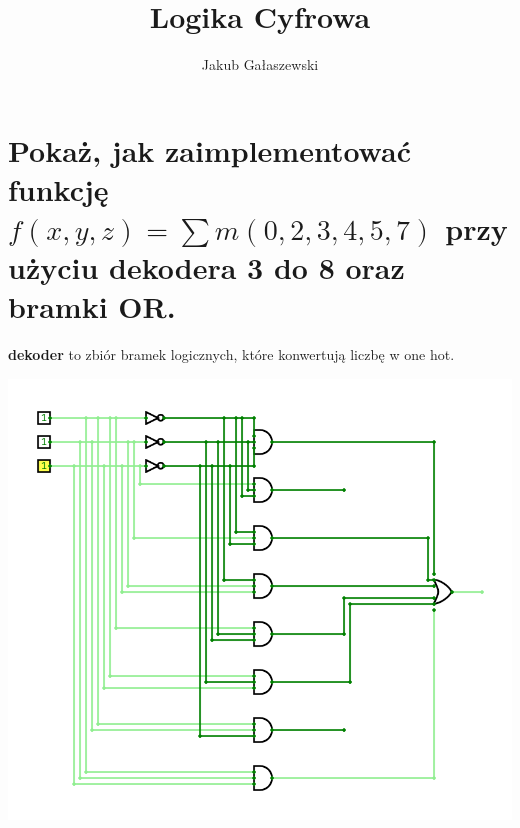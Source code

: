 \documentclass{article}
\title{Logika Cyfrowa}
\author{Jakub Gałaszewski}
\begin{document}
\maketitle
\section{Pokaż, jak zaimplementować funkcję $f (x, y, z) = \sum m(0, 2, 3, 4, 5, 7)$ przy użyciu dekodera 3 do 8 oraz bramki OR.}
\textbf{dekoder} to zbiór bramek logicznych, które konwertują liczbę w one hot.  
\begin{center}
	\includegraphics[scale=0.3]{./L04_Z01.png}
\end{center}
\end{document}

